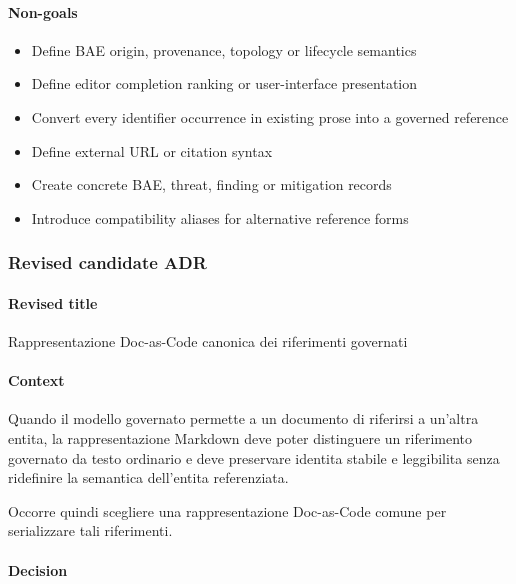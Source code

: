 \documentclass[
  10pt,
]{article}
\providecommand{\tightlist}{%
  \setlength{\itemsep}{0pt}\setlength{\parskip}{0pt}}
\begin{document}
\paragraph{Non-goals}\label{non-goals-5}

\begin{itemize}
\tightlist
\item
  Define BAE origin, provenance, topology or lifecycle semantics
\item
  Define editor completion ranking or user-interface presentation
\item
  Convert every identifier occurrence in existing prose into a governed
  reference
\item
  Define external URL or citation syntax
\item
  Create concrete BAE, threat, finding or mitigation records
\item
  Introduce compatibility aliases for alternative reference forms
\end{itemize}

\subsubsection{Revised candidate ADR}\label{revised-candidate-adr-6}

\paragraph{Revised title}\label{revised-title-6}

Rappresentazione Doc-as-Code canonica dei riferimenti governati

\paragraph{Context}\label{context-13}

Quando il modello governato permette a un documento di riferirsi a
un'altra entita, la rappresentazione Markdown deve poter distinguere un
riferimento governato da testo ordinario e deve preservare identita
stabile e leggibilita senza ridefinire la semantica dell'entita
referenziata.

Occorre quindi scegliere una rappresentazione Doc-as-Code comune per
serializzare tali riferimenti.

\paragraph{Decision}\label{decision-13}
\end{document}
